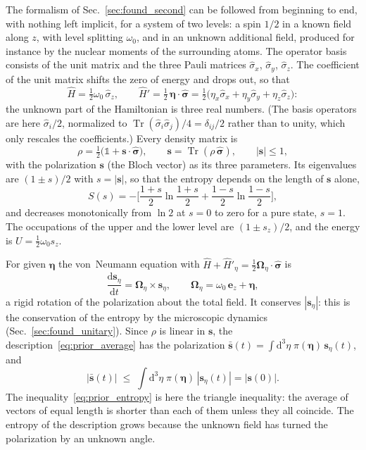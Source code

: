 \documentclass[10pt,a4paper]{article}
\newcommand{\dd}{\mathrm{d}}
\newcommand{\Tr}{\operatorname{Tr}}
\begin{document}
The formalism of Sec.~\ref{sec:found_second} can be followed from beginning to end, with nothing left implicit, for a system of two levels: a spin $ 1/2 $ in a known field along $ z $, with level splitting $ \omega_0 $, and in an unknown additional field, produced for instance by the nuclear moments of the surrounding atoms.
The operator basis consists of the unit matrix and the three Pauli matrices $ \hat\sigma_x $, $ \hat\sigma_y $, $ \hat\sigma_z $.
The coefficient of the unit matrix shifts the zero of energy and drops out, so that
\[
  \hat H = \tfrac12\omega_0\,\hat\sigma_z , \qquad
  \hat H' = \tfrac12\,\boldsymbol{\eta}\cdot\hat{\boldsymbol{\sigma}}
  = \tfrac12\big(\eta_x\hat\sigma_x + \eta_y\hat\sigma_y + \eta_z\hat\sigma_z\big) :
\]
the unknown part of the Hamiltonian is three real numbers.
(The basis operators are here $ \hat\sigma_i/2 $, normalized to $ \Tr(\hat\sigma_i\hat\sigma_j)/4 = \delta_{ij}/2 $ rather than to unity, which only rescales the coefficients.)
Every density matrix is
\[
  \rho = \tfrac12\big(\mathbb{1} + \mathbf{s}\cdot\hat{\boldsymbol{\sigma}}\big) , \qquad
  \mathbf{s} = \Tr(\rho\,\hat{\boldsymbol{\sigma}}) , \qquad |\mathbf{s}| \leq 1 ,
\]
with the polarization $ \mathbf{s} $ (the Bloch vector) as its three parameters.
Its eigenvalues are $ (1 \pm s)/2 $ with $ s = |\mathbf{s}| $, so that the entropy depends on the length of $ \mathbf{s} $ alone,
\[
  S(s) = -\Big[\frac{1 + s}{2}\ln\frac{1 + s}{2} + \frac{1 - s}{2}\ln\frac{1 - s}{2}\Big] ,
\]
and decreases monotonically from $ \ln2 $ at $ s = 0 $ to zero for a pure state, $ s = 1 $.
The occupations of the upper and the lower level are $ (1 \pm s_z)/2 $, and the energy is $ U = \tfrac12\omega_0s_z $.

For given $ \boldsymbol{\eta} $ the von~Neumann equation with $ \hat H + \hat H'_\eta = \tfrac12\boldsymbol{\Omega}_\eta\cdot\hat{\boldsymbol{\sigma}} $ is
\[
  \frac{\dd\mathbf{s}_\eta}{\dd t} = \boldsymbol{\Omega}_\eta\times\mathbf{s}_\eta , \qquad
  \boldsymbol{\Omega}_\eta = \omega_0\,\mathbf{e}_z + \boldsymbol{\eta} ,
\]
a rigid rotation of the polarization about the total field.
It conserves $ |\mathbf{s}_\eta| $: this is the conservation of the entropy by the microscopic dynamics (Sec.~\ref{sec:found_unitary}).
Since $ \rho $ is linear in $ \mathbf{s} $, the description~\eqref{eq:prior_average} has the polarization $ \bar{\mathbf{s}}(t) = \int \dd^{3}\eta\;\pi(\boldsymbol{\eta})\,\mathbf{s}_\eta(t) $, and
\[
  |\bar{\mathbf{s}}(t)| \;\leq\; \int\!\dd^{3}\eta\;\pi(\boldsymbol{\eta})\,|\mathbf{s}_\eta(t)|
  = |\mathbf{s}(0)| .
\]
The inequality~\eqref{eq:prior_entropy} is here the triangle inequality: the average of vectors of equal length is shorter than each of them unless they all coincide.
The entropy of the description grows because the unknown field has turned the polarization by an unknown angle.
\end{document}
